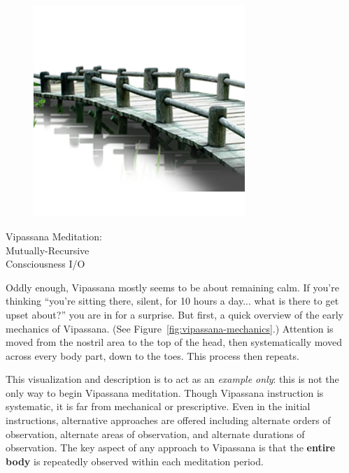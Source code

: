 \documentclass{article}
\begin{document}
\begin{figure}[H]
  \centering
  \includegraphics[width=8cm]{images/bridge.png}
  \label{fig:bridge}
\end{figure}


\pagebreak

\begin{center}
  \Huge{Vipassana Meditation:}\\
  \Huge{Mutually-Recursive}\\
  \Huge{Consciousness I/O}
\end{center}

Oddly enough, Vipassana mostly seems to be about remaining calm. If you're thinking ``you're sitting there, silent, for 10 hours a day... what is there to get upset about?'' you are in for a surprise. But first, a quick overview of the early mechanics of Vipassana. (See Figure~\ref{fig:vipassana-mechanics}.)
Attention is moved from the nostril area to the top of the head, then systematically moved across every body part, down to the toes. This process then repeats.

This visualization and description is to act as an \textit{example only}: this is not the only way to begin Vipassana meditation. Though Vipassana instruction is systematic, it is far from mechanical or prescriptive. Even in the initial instructions, alternative approaches are offered including alternate orders of observation, alternate areas of observation, and alternate durations of observation. The key aspect of any approach to Vipassana is that the \textbf{entire body} is repeatedly observed within each meditation period.
\end{document}
